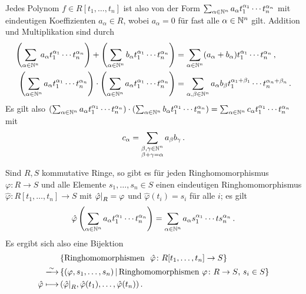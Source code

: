 Jedes Polynom $f \in R[t_1, \dotsc, t_n]$ ist also von der Form $\sum_{\alpha \in \mathbb{N}^n} a_\alpha t_1^{\alpha_1} \dotsm t_n^{\alpha_n}$ mit eindeutigen Koeffizienten $a_\alpha \in R$, wobei $a_\alpha = 0$ für fast alle $\alpha \in \mathbb{N}^n$ gilt.
Addition und Multiplikation sind durch
\begin{align*}
        \left( \sum_{\alpha \in \mathbb{N}^n} a_\alpha t_1^{\alpha_1} \dotsm t_n^{\alpha_n} \right)
      + \left( \sum_{\alpha \in \mathbb{N}^n} b_\alpha t_1^{\alpha_1} \dotsm t_n^{\alpha_n} \right)
  &=  \sum_{\alpha \in \mathbb{N}^n} (a_\alpha + b_\alpha)  t_1^{\alpha_1} \dotsm t_n^{\alpha_n} \,,
  \\
            \left( \sum_{\alpha \in \mathbb{N}^n} a_\alpha t_1^{\alpha_1} \dotsm t_n^{\alpha_n} \right)
      \cdot \left( \sum_{\alpha \in \mathbb{N}^n} a_\alpha t_1^{\alpha_1} \dotsm t_n^{\alpha_n} \right)
  &=  \sum_{\alpha, \beta \in \mathbb{N}^n} a_\alpha b_\beta  t_1^{\alpha_1 + \beta_1} \dotsm t_n^{\alpha_n + \beta_n} \,.
\end{align*}
Es gilt also $( \sum_{\alpha \in \mathbb{N}^n} a_\alpha t_1^{\alpha_1} \dotsm t_n^{\alpha_n} ) \cdot ( \sum_{\alpha \in \mathbb{N}^n} b_\alpha t_1^{\alpha_1} \dotsm t_n^{\alpha_n} ) = \sum_{\alpha \in \mathbb{N}^n} c_\alpha t_1^{\alpha_1} \dotsm t_n^{\alpha_n}$ mit
\[
    c_\alpha
  = \sum_{\substack{\beta, \gamma \in \mathbb{N}^n \\ \beta + \gamma = \alpha}} a_\beta b_\gamma \,.
\]

\begin{theorem}
  Sind $R, S$ kommutative Ringe, so gibt es für jeden Ringhomomorphismus $\varphi \colon R \to S$ und alle Elemente $s_1, \dotsc, s_n \in S$ einen eindeutigen Ringhomomorphismus $\hat{\varphi} \colon R[t_1, \dotsc, t_n] \to S$ mit $\restrict{\hat{\varphi}}{R} = \varphi$ und $\hat{\varphi}(t_i) = s_i$ für alle $i$;
  es gilt
  \[
      \hat{\varphi}\left( \sum_{\alpha \in \mathbb{N}^n} a_\alpha t_1^{\alpha_1} \dotsm t_n^{\alpha_n} \right)
    = \sum_{\alpha \in \mathbb{N}^n} a_\alpha s_1^{\alpha_1} \dotsm ts_n^{\alpha_n} \,.
  \]
  Es ergibt sich also eine Bijektion
  \begin{align*}
                          &\, \{\text{Ringhomomorphismen \ $\hat{\varphi} \colon R[t_1, \dotsc, t_n] \to S$}\}  \\
    \xlongrightarrow{\sim}&\, \{
                                (\varphi, s_1, \dotsc, s_n)
                              \suchthat
                                  \text{Ringhomomorphismen $\varphi \colon R \to S$, $s_i \in S$}
                              \}  \\
                              \hat{\varphi}
    \longmapsto&\,            ( \restrict{\hat{\varphi}}{R}, \hat{\varphi}(t_1), \dotsc, \hat{\varphi}(t_n) ) \,.
  \end{align*}
\end{theorem}

